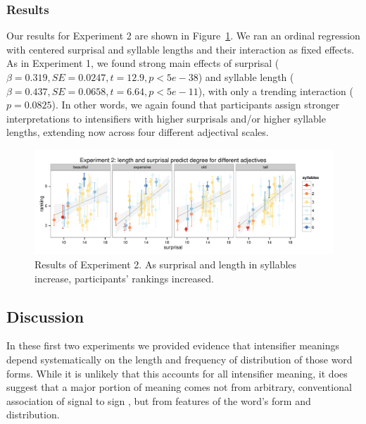 \documentclass[a4paper,10pt]{article}
\begin{document}
    \subsubsection{Results}
      Our results for Experiment 2 are shown in Figure~\ref{exp2-plot}. We ran an ordinal
      regression with centered surprisal and syllable lengths and their interaction as fixed effects.
      As in Experiment 1, we found strong main effects of surprisal ($\beta=0.319, SE=0.0247, t=12.9, p<5e-38$) and syllable length ($\beta=0.437, SE=0.0658, t=6.64, p<5e-11$), with only a trending interaction ($p=0.0825$).
      In other words, we again found that participants assign stronger interpretations to intensifiers with higher surprisals and/or higher syllable lengths, extending now across four different adjectival scales.

      \begin{figure}[ht]
      \begin{center}
      \includegraphics[width=\textwidth]{exp2.pdf}
      \end{center}
      \caption{Results of Experiment 2. As surprisal and length in syllables increase, participants' rankings increased.} 
      \label{exp2-plot}
      \end{figure}
      
  \subsection{Discussion}    
      In these first two experiments we provided evidence that intensifier meanings depend systematically on the length and frequency of distribution of those word forms.
      While it is unlikely that this accounts for all intensifier meaning, it does suggest that a major portion of meaning comes not from arbitrary, conventional association of signal to sign \cite{saussure}, but from features of the word's form and distribution.
\end{document}
